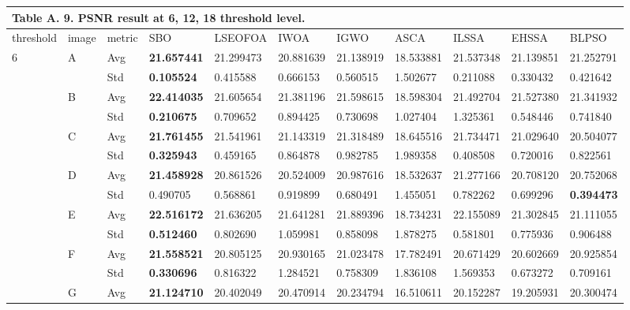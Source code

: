\documentclass{article} %
\begin{document}
\textbf{}

\begin{tabular}{|p{0.4in}|p{0.3in}|p{0.3in}|p{0.5in}|p{0.5in}|p{0.5in}|p{0.5in}|p{0.5in}|p{0.5in}|p{0.5in}|p{0.5in}|} \hline 
\multicolumn{11}{|p{1in}|}{\textbf{Table A. }9\textbf{.} PSNR result at 6, 12, 18 threshold level.} \\ \hline 
threshold & image & metric & SBO & LSEOFOA & IWOA & IGWO & ASCA & ILSSA & EHSSA & BLPSO \\ \hline 
6 & A & Avg & \textbf{21.657441 } & 21.299473  & 20.881639  & 21.138919  & 18.533881  & 21.537348  & 21.139851  & 21.252791  \\ \hline 
 &  & Std & \textbf{0.105524 } & 0.415588  & 0.666153  & 0.560515  & 1.502677  & 0.211088  & 0.330432  & 0.421642  \\ \hline 
 & B & Avg & \textbf{22.414035 } & 21.605654  & 21.381196  & 21.598615  & 18.598304  & 21.492704  & 21.527380  & 21.341932  \\ \hline 
 &  & Std & \textbf{0.210675 } & 0.709652  & 0.894425  & 0.730698  & 1.027404  & 1.325361  & 0.548446  & 0.741840  \\ \hline 
 & C & Avg & \textbf{21.761455 } & 21.541961  & 21.143319  & 21.318489  & 18.645516  & 21.734471  & 21.029640  & 20.504077  \\ \hline 
 &  & Std & \textbf{0.325943 } & 0.459165  & 0.864878  & 0.982785  & 1.989358  & 0.408508  & 0.720016  & 0.822561  \\ \hline 
 & D & Avg & \textbf{21.458928 } & 20.861526  & 20.524009  & 20.987616  & 18.532637  & 21.277166  & 20.708120  & 20.752068  \\ \hline 
 &  & Std & 0.490705  & 0.568861  & 0.919899  & 0.680491  & 1.455051  & 0.782262  & 0.699296  & \textbf{0.394473 } \\ \hline 
 & E & Avg & \textbf{22.516172 } & 21.636205  & 21.641281  & 21.889396  & 18.734231  & 22.155089  & 21.302845  & 21.111055  \\ \hline 
 &  & Std & \textbf{0.512460 } & 0.802690  & 1.059981  & 0.858098  & 1.878275  & 0.581801  & 0.775936  & 0.906488  \\ \hline 
 & F & Avg & \textbf{21.558521 } & 20.805125  & 20.930165  & 21.023478  & 17.782491  & 20.671429  & 20.602669  & 20.925854  \\ \hline 
 &  & Std & \textbf{0.330696 } & 0.816322  & 1.284521  & 0.758309  & 1.836108  & 1.569353  & 0.673272  & 0.709161  \\ \hline 
 & G & Avg & \textbf{21.124710 } & 20.402049  & 20.470914  & 20.234794  & 16.510611  & 20.152287  & 19.205931  & 20.300474  \\ \hline 

\end{tabular}
\end{document}
